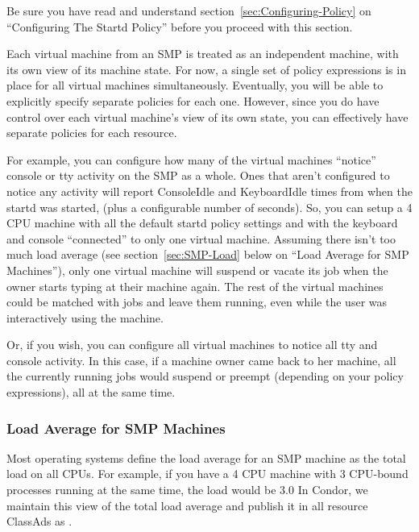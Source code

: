 \Note Be sure you have read and understand
section~\ref{sec:Configuring-Policy} on ``Configuring The Startd
Policy'' before you proceed with this section.

Each virtual machine from an SMP is treated as an independent machine,
with its own view of its machine state.
For now, a single set of policy expressions is in place for all
virtual machines simultaneously.  
Eventually, you will be able to explicitly specify separate policies
for each one.
However, since you do have control over each virtual machine's view of
its own state, you can effectively have separate policies for each
resource.

For example, you can configure how many of the virtual machines
``notice'' console or tty activity on the SMP as a whole.
Ones that aren't configured to notice any activity will report
ConsoleIdle and KeyboardIdle times from when the startd was started,
(plus a configurable number of seconds).
So, you can setup a 4 CPU machine with all the default startd policy
settings and with the keyboard and console ``connected'' to only one
virtual machine.
Assuming there isn't too much load average (see
section~\ref{sec:SMP-Load} below on ``Load Average for SMP
Machines''), only one virtual machine will suspend or vacate its job
when the owner starts typing at their machine again.
The rest of the virtual machines could be matched with jobs and leave
them running, even while the user was interactively using the
machine. 

Or, if you wish, you can configure all virtual machines to notice all
tty and console activity.
In this case, if a machine owner came back to her machine, all the
currently running jobs would suspend or preempt (depending on your
policy expressions), all at the same time.

\subsubsection{\label{sec:SMP-Load}
Load Average for SMP Machines}

Most operating systems define the load average for an SMP machine as
the total load on all CPUs.
For example, if you have a 4 CPU machine with 3 CPU-bound processes
running at the same time, the load would be 3.0
In Condor, we maintain this view of the total load average and publish
it in all resource ClassAds as .


